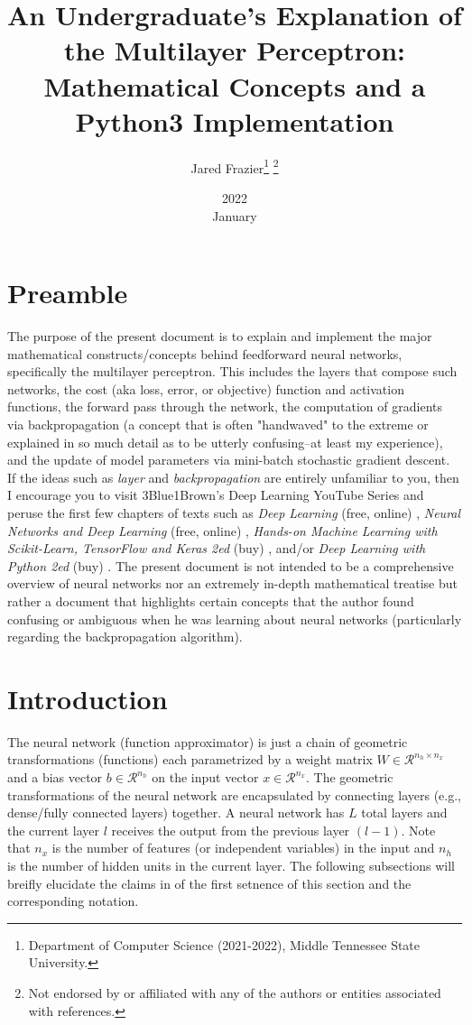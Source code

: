 \documentclass{article}
\title{
	An Undergraduate's Explanation of the Multilayer Perceptron: 
	Mathematical Concepts and a Python3 Implementation}
\date{2022 \\ January}
\author{Jared Frazier\thanks{Department of Computer Science (2021-2022), 
Middle Tennessee State University.} \thanks{Not endorsed by or affiliated with any of the 
authors or entities associated with references.}}
\begin{document}
\maketitle

\section{Preamble}
\quad The purpose of the present document is to explain and implement the major mathematical
constructs/concepts behind feedforward neural networks, specifically the multilayer perceptron.
This includes the layers that compose such networks, the cost (aka loss, error, or objective) function
and activation functions, the forward pass through the network,
the computation of gradients via backpropagation (a concept that is often "handwaved" to the extreme
or explained in so much detail as to be utterly confusing--at least my experience),
and the update of model parameters via mini-batch stochastic gradient descent.
If the ideas such as \textit{layer} and \textit{backpropagation} are entirely unfamiliar
to you, then I encourage you to visit 3Blue1Brown's Deep Learning YouTube Series \cite{3Blue1BrownWhatIsANN2017}
and peruse the first few chapters of texts such as \textit{Deep Learning} (free, online) \cite{Goodfellow2016},
\textit{Neural Networks and Deep Learning} (free, online) \cite{Nielsen2015},
\textit{Hands-on Machine Learning with Scikit-Learn, TensorFlow and Keras 2ed} (buy) \cite{Geron2020},
and/or \textit{Deep Learning with Python 2ed} (buy) \cite{Chollet2021}. The present document
is not intended to be a comprehensive overview of neural networks nor an extremely
in-depth mathematical treatise but rather a document that highlights certain concepts that the
author found confusing or ambiguous when he was learning about neural networks
(particularly regarding the backpropagation algorithm).

\section{Introduction}

\quad The neural network (function approximator) is just a chain of geometric transformations (functions)
each parametrized by a weight matrix $W \in \mathcal{R}^{n_h \times n_x}$ and
a bias vector $b \in \mathcal{R}^{n_h}$ on the input vector $x \in \mathcal{R}^{n_x}$.
The geometric transformations of the neural network are encapsulated by connecting
layers (e.g., dense/fully connected layers) together. A neural network has $L$ total
layers and the current layer $l$ receives the output from the previous layer $(l-1)$.
Note that $n_x$ is the number of features (or independent variables) in the input
and $n_h$ is the number of hidden units in the current layer. The following subsections will
breifly elucidate the claims in of the first setnence of this section and the
corresponding notation.
\end{document}
